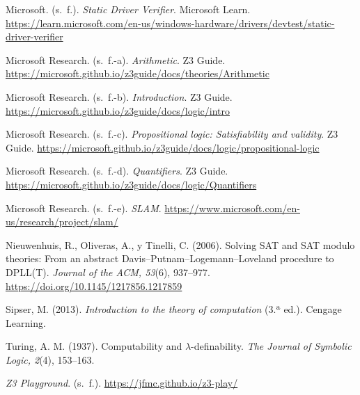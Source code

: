 \documentclass[11pt,letterpaper]{article}
\begin{document}
\begin{list}{}{\setlength{\leftmargin}{1.27cm}\setlength{\itemindent}{-1.27cm}\setlength{\itemsep}{4pt}\setlength{\parsep}{0pt}}
\item Microsoft. (s.~f.). \emph{Static Driver Verifier}. Microsoft Learn. \url{https://learn.microsoft.com/en-us/windows-hardware/drivers/devtest/static-driver-verifier}
\item Microsoft Research. (s.~f.-a). \emph{Arithmetic}. Z3 Guide. \url{https://microsoft.github.io/z3guide/docs/theories/Arithmetic}
\item Microsoft Research. (s.~f.-b). \emph{Introduction}. Z3 Guide. \url{https://microsoft.github.io/z3guide/docs/logic/intro}
\item Microsoft Research. (s.~f.-c). \emph{Propositional logic: Satisfiability and validity}. Z3 Guide. \url{https://microsoft.github.io/z3guide/docs/logic/propositional-logic}
\item Microsoft Research. (s.~f.-d). \emph{Quantifiers}. Z3 Guide. \url{https://microsoft.github.io/z3guide/docs/logic/Quantifiers}
\item Microsoft Research. (s.~f.-e). \emph{SLAM}. \url{https://www.microsoft.com/en-us/research/project/slam/}
\item Nieuwenhuis, R., Oliveras, A., y Tinelli, C. (2006). Solving SAT and SAT modulo theories: From an abstract Davis--Putnam--Logemann--Loveland procedure to DPLL(T). \emph{Journal of the ACM, 53}(6), 937--977. \url{https://doi.org/10.1145/1217856.1217859}
\item Sipser, M. (2013). \emph{Introduction to the theory of computation} (3.ª ed.). Cengage Learning.
\item Turing, A. M. (1937). Computability and $\lambda$-definability. \emph{The Journal of Symbolic Logic, 2}(4), 153--163.
\item \emph{Z3 Playground}. (s.~f.). \url{https://jfmc.github.io/z3-play/}
\end{list}

{\renewcommand{\thefootnote}{}}
\end{document}
